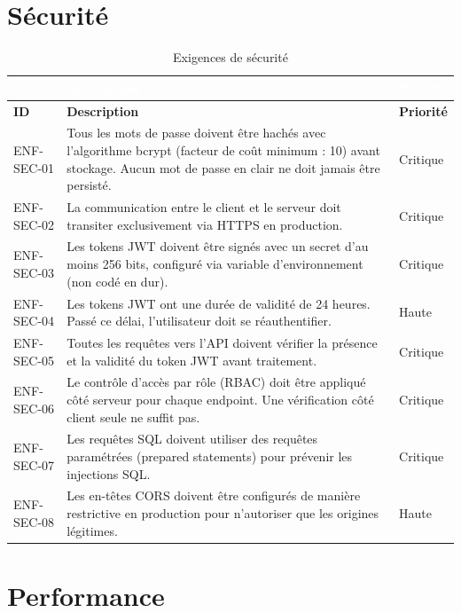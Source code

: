 \documentclass[12pt,a4paper]{report}
\begin{document}
\section{Sécurité}

\begin{longtable}{|C{1.8cm}|L{9cm}|C{2cm}|}
\caption{Exigences de sécurité} \\
\hline
{}\textcolor{white}{\textbf{ID}} & \textcolor{white}{\textbf{Description}} & \textcolor{white}{\textbf{Priorité}} \\
\hline
\endfirsthead
\hline
\textbf{ID} & \textbf{Description} & \textbf{Priorité} \\
\hline
\endhead
ENF-SEC-01 & Tous les mots de passe doivent être hachés avec l'algorithme bcrypt (facteur de coût minimum : 10) avant stockage. Aucun mot de passe en clair ne doit jamais être persisté. & Critique \\
\hline
ENF-SEC-02 & La communication entre le client et le serveur doit transiter exclusivement via HTTPS en production. & Critique \\
\hline
ENF-SEC-03 & Les tokens JWT doivent être signés avec un secret d'au moins 256 bits, configuré via variable d'environnement (non codé en dur). & Critique \\
\hline
ENF-SEC-04 & Les tokens JWT ont une durée de validité de 24 heures. Passé ce délai, l'utilisateur doit se réauthentifier. & Haute \\
\hline
ENF-SEC-05 & Toutes les requêtes vers l'API doivent vérifier la présence et la validité du token JWT avant traitement. & Critique \\
\hline
ENF-SEC-06 & Le contrôle d'accès par rôle (RBAC) doit être appliqué côté serveur pour chaque endpoint. Une vérification côté client seule ne suffit pas. & Critique \\
\hline
ENF-SEC-07 & Les requêtes SQL doivent utiliser des requêtes paramétrées (prepared statements) pour prévenir les injections SQL. & Critique \\
\hline
ENF-SEC-08 & Les en-têtes CORS doivent être configurés de manière restrictive en production pour n'autoriser que les origines légitimes. & Haute \\
\hline
\end{longtable}

\section{Performance}
\end{document}
